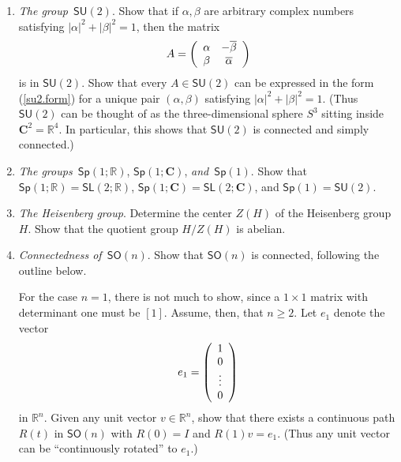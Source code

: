 \documentclass[12pt]{amsbook}
\theoremstyle{plain}
\numberwithin{equation}{chapter}
\numberwithin{theorem}{chapter}
\begin{document}
\begin{enumerate}
\item \label{su2}\textit{The group}\emph{\ }$\mathsf{SU}(2)$. Show that if
$\alpha,\beta$ are arbitrary complex numbers satisfying $\left|
\alpha\right|  ^{2}+\left|  \beta\right|  ^{2}=1$, then the matrix
\begin{equation}
A=\left(
\begin{array}
[c]{cc}%
\alpha & -\overline{\beta}\\
\beta & \overline{\alpha}%
\end{array}
\right)  \label{su2.form}%
\end{equation}
is in $\mathsf{SU}(2)$. Show that every $A\in\mathsf{SU}(2)$ can be expressed
in the form (\ref{su2.form}) for a unique pair $(\alpha,\beta)$ satisfying
$\left|  \alpha\right|  ^{2}+\left|  \beta\right|  ^{2}=1$. (Thus
$\mathsf{SU}(2)$ can be thought of as the three-dimensional sphere $S^{3}$
sitting inside $\mathbf{C}^{2}=\mathbb{R}^{4}$. In particular, this shows that
$\mathsf{SU}(2)$ is connected and simply connected.)

\item \label{sp1}\textit{The groups}\emph{\ }$\mathsf{Sp}\left(
1;\mathbb{R}\right)  $, $\mathsf{Sp}\left(  1;\mathbf{C}\right)  $,
\textit{and}\emph{\ }$\mathsf{Sp}\left(  1\right)  $. Show that $\mathsf{Sp}%
\left(  1;\mathbb{R}\right)  =\mathsf{SL}\left(  2;\mathbb{R}\right)  $,
$\mathsf{Sp}\left(  1;\mathbf{C}\right)  =\mathsf{SL}\left(  2;\mathbf{C}%
\right)  $, and $\mathsf{Sp}(1)=\mathsf{SU}(2)$.

\item \label{heisenberg.center}\textit{The Heisenberg group}. Determine the
center $Z(H)$ of the Heisenberg group $H$. Show that the quotient group
$H/Z(H)$ is abelian.

\item \label{connect.son}\textit{Connectedness of}\emph{\ }$\mathsf{SO}(n)$.
Show that $\mathsf{SO}(n)$ is connected, following the outline below.

For the case $n=1$, there is not much to show, since a $1\times1$ matrix with
determinant one must be $\left[  1\right]  $. Assume, then, that $n\geq2$. Let
$e_{1}$ denote the vector
\[
e_{1}=\left(
\begin{array}
[c]{c}%
1\\
0\\
\vdots\\
0
\end{array}
\right)
\]
in $\mathbb{R}^{n}$. Given any unit vector $v\in\mathbb{R}^{n}$, show that
there exists a continuous path $R(t)$ in $\mathsf{SO}(n)$ with $R(0)=I$ and
$R(1)v=e_{1}$. (Thus any unit vector can be ``continuously rotated'' to
$e_{1}$.)


\end{enumerate}
\end{document}
